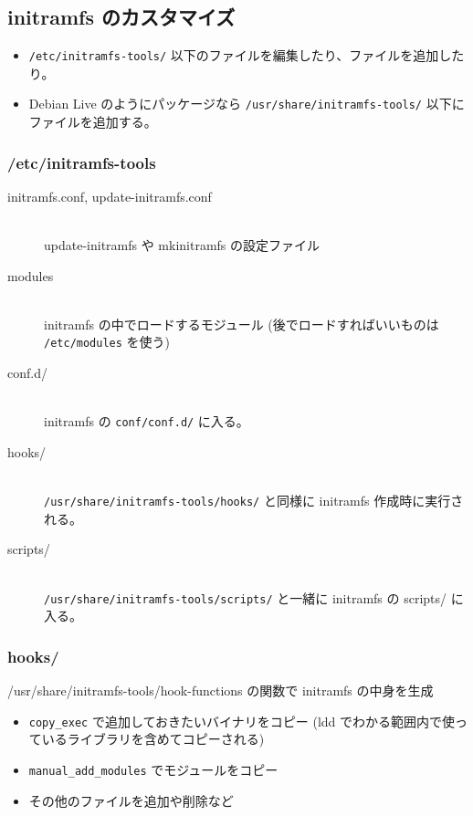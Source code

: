 \documentclass[mingoth,a4paper]{jsarticle}
\begin{document}
\subsection{initramfs のカスタマイズ}

\begin{itemize}
\item \texttt{/etc/initramfs-tools/} 以下のファイルを編集したり、ファイルを追加したり。
\item Debian Live のようにパッケージなら \texttt{/usr/share/initramfs-tools/} 以下にファイルを追加する。
\end{itemize}
\subsubsection{/etc/initramfs-tools}

\begin{description}
\item [initramfs.conf, update-initramfs.conf]　\\ update-initramfs や mkinitramfs の設定ファイル
\item [modules ]　\\ initramfs の中でロードするモジュール (後でロードすればいいものは \texttt{/etc/modules} を使う)
\item [conf.d/]　\\ initramfs の \texttt{conf/conf.d/} に入る。
\item [hooks/]　\\ \texttt{/usr/share/initramfs-tools/hooks/} と同様に initramfs 作成時に実行される。
\item [scripts/]　\\ \texttt{/usr/share/initramfs-tools/scripts/} と一緒に initramfs の scripts/ に入る。
\end{description}
\subsubsection{hooks/}

/usr/share/initramfs-tools/hook-functions の関数で initramfs の中身を生成
\begin{itemize}
\item \texttt{copy\_exec} で追加しておきたいバイナリをコピー
    (ldd でわかる範囲内で使っているライブラリを含めてコピーされる)
\item \texttt{manual\_add\_modules} でモジュールをコピー
\item その他のファイルを追加や削除など
\end{itemize}
\end{document}
